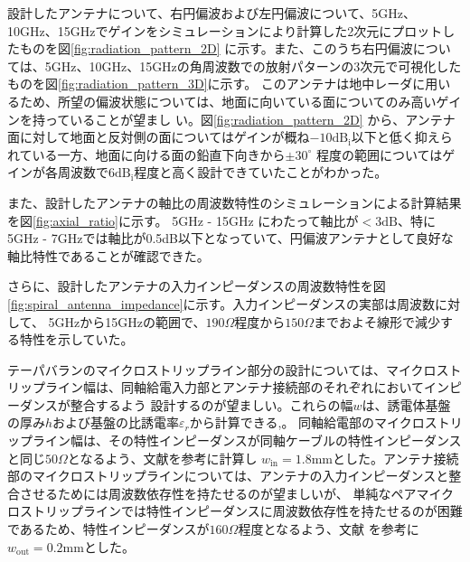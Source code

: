 \documentclass[11pt,a4paper,uplatex,draft]{ujarticle}
\begin{document}
  設計したアンテナについて、右円偏波および左円偏波について、5GHz、10GHz、15GHzでゲインをシミュレーションにより計算した2次元にプロットしたものを図\ref{fig:radiation_pattern_2D}
  に示す。また、このうち右円偏波については、5GHz、10GHz、15GHzの角周波数での放射パターンの3次元で可視化したものを図\ref{fig:radiation_pattern_3D}に示す。
  このアンテナは地中レーダに用いるため、所望の偏波状態については、地面に向いている面についてのみ高いゲインを持っていることが望まし
  い。図\ref{fig:radiation_pattern_2D}
  から、アンテナ面に対して地面と反対側の面についてはゲインが概ね$-10\mathrm{dB_i}$以下と低く抑えられている一方、地面に向ける面の鉛直下向きから$\displaystyle \pm 30^{\circ}$
  程度の範囲についてはゲインが各周波数で$6\mathrm{dB_i}$程度と高く設計できていたことがわかった。

  また、設計したアンテナの軸比の周波数特性のシミュレーションによる計算結果を図\ref{fig:axial_ratio}に示す。
  5GHz - 15GHz にわたって軸比が$<3\mathrm{dB}$、特に5GHz - 7GHzでは軸比が0.5dB以下となっていて、円偏波アンテナとして良好な軸比特性であることが確認できた。

  さらに、設計したアンテナの入力インピーダンスの周波数特性を図\ref{fig:spiral_antenna_impedance}に示す。入力インピーダンスの実部は周波数に対して、
  5GHzから15GHzの範囲で、$190\Omega$程度から$150\Omega$までおよそ線形で減少する特性を示していた。

  テーパバランのマイクロストリップライン部分の設計については、マイクロストリップライン幅は、同軸給電入力部とアンテナ接続部のそれぞれにおいてインピーダンスが整合するよう
  設計するのが望ましい。これらの幅$w$は、誘電体基盤の厚み$h$および基盤の比誘電率$\varepsilon_r$から計算できる\cite{ground_microstrip_line},\cite{pair_microstrip_line}。
  同軸給電部のマイクロストリップライン幅は、その特性インピーダンスが同軸ケーブルの特性インピーダンスと同じ$50\Omega$となるよう、文献\cite{ground_microstrip_line}を参考に計算し
  $w_{\mathrm{in}} = 1.8\mathrm{mm}$とした。アンテナ接続部のマイクロストリップラインについては、アンテナの入力インピーダンスと整合させるためには周波数依存性を持たせるのが望ましいが、
  単純なペアマイクロストリップラインでは特性インピーダンスに周波数依存性を持たせるのが困難であるため、特性インピーダンスが$160\Omega$程度となるよう、文献\cite{pair_microstrip_line}
  を参考に$w_{\mathrm{out}} = 0.2\mathrm{mm}$とした。
\end{document}
